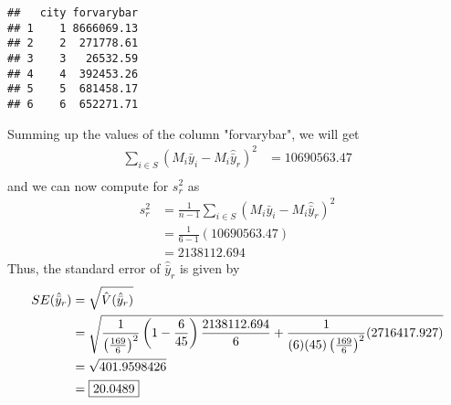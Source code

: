 \documentclass[]{article}
\newenvironment{Shaded}{\begin{snugshade}}{\end{snugshade}}
\newcommand{\AttributeTok}[1]{\textcolor[rgb]{0.13,0.29,0.53}{#1}}
\newcommand{\DecValTok}[1]{\textcolor[rgb]{0.00,0.00,0.81}{#1}}
\newcommand{\FloatTok}[1]{\textcolor[rgb]{0.00,0.00,0.81}{#1}}
\newcommand{\FunctionTok}[1]{\textcolor[rgb]{0.13,0.29,0.53}{\textbf{#1}}}
\newcommand{\NormalTok}[1]{#1}
\newcommand{\OtherTok}[1]{\textcolor[rgb]{0.56,0.35,0.01}{#1}}
\newcommand{\SpecialCharTok}[1]{\textcolor[rgb]{0.81,0.36,0.00}{\textbf{#1}}}
\begin{document}
\begin{Shaded}
\end{Shaded}

\begin{verbatim}
##   city forvarybar
## 1    1 8666069.13
## 2    2  271778.61
## 3    3   26532.59
## 4    4  392453.26
## 5    5  681458.17
## 6    6  652271.71
\end{verbatim}

Summing up the values of the column "forvarybar", we will get 
\[
\begin{aligned}
\sum_{i \in S}(M_i\bar y_i - M_i\hat{\bar y}_r)^2 &= 10690563.47  \\
\end{aligned}
\]
and we can now compute for $s_r^2$ as 
\[
\begin{aligned}
s_r^2 &= \frac{1}{n-1}\sum_{i \in S}(M_i\bar y_i - M_i\hat{\bar y}_r)^2 \\
&= \frac{1}{6-1}(10690563.47) \\
&= 2138112.694
\end{aligned}
\]
Thus, the standard error of $\hat{\bar y}_r$ is given by
\[
\begin{aligned}
SE(\hat{\bar y}_r) &= \sqrt{\hat V(\hat{\bar y}_r)} \\
&= \sqrt{\frac{1}{\left(\frac{169}{6}\right)^2}\left(1-\frac{6}{45}\right)\frac{2138112.694}{6} + \frac{1}{(6)(45)\left(\frac{169}{6}\right)^2}(2716417.927 )} \\
&= \sqrt{401.9598426} \\
&= \fbox{20.0489}
\end{aligned}
\]
\end{document}
